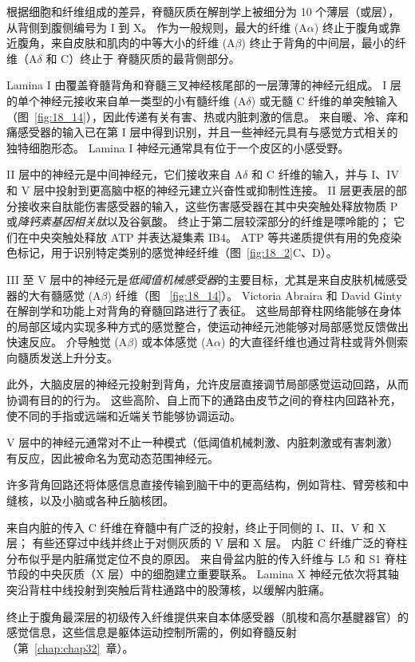 根据细胞和纤维组成的差异，脊髓灰质在解剖学上被细分为 10 个薄层（或层），从背侧到腹侧编号为 I 到 X。
作为一般规则，最大的纤维 (A$\alpha$) 终止于腹角或靠近腹角，来自皮肤和肌肉的中等大小的纤维 (A$\beta$) 终止于背角的中间层，最小的纤维（A$\delta$ 和 C）终止于 脊髓灰质的最背侧部分。


Lamina I 由覆盖脊髓背角和脊髓三叉神经核尾部的一层薄薄的神经元组成。
I 层的单个神经元接收来自单一类型的小有髓纤维 (A$\delta$) 或无髓 C 纤维的单突触输入（图~\ref{fig:18_14}），因此传递有关有害、热或内脏刺激的信息。
来自暖、冷、痒和痛感受器的输入已在第 I 层中得到识别，并且一些神经元具有与感觉方式相关的独特细胞形态。
Lamina I 神经元通常具有位于一个皮区的小感受野。


II 层中的神经元是中间神经元，它们接收来自 A$\delta$ 和 C 纤维的输入，并与 I、IV 和 V 层中投射到更高脑中枢的神经元建立兴奋性或抑制性连接。
II 层更表层的部分接收来自肽能伤害感受器的输入，这些伤害感受器在其中央突触处释放物质 P 或\textit{降钙素基因相关肽}以及谷氨酸。
终止于第二层较深部分的纤维是嘌呤能的；
它们在中央突触处释放 ATP 并表达凝集素 IB4。
ATP 等共递质提供有用的免疫染色标记，用于识别特定类别的感觉神经纤维（图~\ref{fig:18_2}C、D）。


III 至 V 层中的神经元是\textit{低阈值机械感受器}的主要目标，尤其是来自皮肤机械感受器的大有髓感觉 (A$\beta$) 纤维（图 ~\ref{fig:18_14}）。
Victoria Abraira 和 David Ginty 在解剖学和功能上对背角的脊髓回路进行了表征。
这些局部脊柱网络能够在身体的局部区域内实现多种方式的感觉整合，使运动神经元池能够对局部感觉反馈做出快速反应。
介导触觉 (A$\beta$) 或本体感觉 (A$\alpha$) 的大直径纤维也通过背柱或背外侧索向髓质发送上升分支。


此外，大脑皮层的神经元投射到背角，允许皮层直接调节局部感觉运动回路，从而协调有目的的行为。
这些高阶、自上而下的通路由皮节之间的脊柱内回路补充，使不同的手指或远端和近端关节能够协调运动。


V 层中的神经元通常对不止一种模式（低阈值机械刺激、内脏刺激或有害刺激）有反应，因此被命名为宽动态范围神经元。


许多背角回路还将体感信息直接传输到脑干中的更高结构，例如背柱、臂旁核和中缝核，以及小脑或各种丘脑核团。


来自内脏的传入 C 纤维在脊髓中有广泛的投射，终止于同侧的 I、II、V 和 X 层；
有些还穿过中线并终止于对侧灰质的 V 层和 X 层。
内脏 C 纤维广泛的脊柱分布似乎是内脏痛觉定位不良的原因。 
来自骨盆内脏的传入纤维与 L5 和 S1 脊柱节段的中央灰质（X 层）中的细胞建立重要联系。 
Lamina X 神经元依次将其轴突沿背柱中线投射到突触后背柱通路中的股薄核，以缓解内脏痛。


终止于腹角最深层的初级传入纤维提供来自本体感受器（肌梭和高尔基腱器官）的感觉信息，这些信息是躯体运动控制所需的，例如脊髓反射（第~\ref{chap:chap32}~章）。


